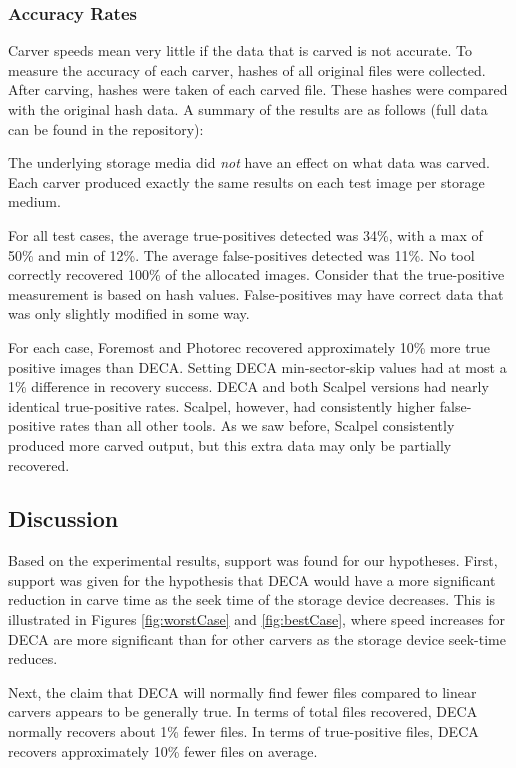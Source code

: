 \documentclass[final,5p,times,twocolumn,authoryear]{elsarticle}
\begin{document}
\subsubsection{Accuracy Rates}
Carver speeds mean very little if the data that is carved is not accurate. To measure the accuracy of each carver, hashes of all original files were collected. After carving, hashes were taken of each carved file. These hashes were compared with the original hash data. A summary of the results are as follows (full data can be found in the repository):

The underlying storage media did \emph{not} have an effect on what data was carved. Each carver produced exactly the same results on each test image per storage medium.

For all test cases, the average true-positives detected was 34\%, with a max of 50\% and min of 12\%. The average false-positives detected was 11\%. No tool correctly recovered 100\% of the allocated images. Consider that the true-positive measurement is based on hash values. False-positives may have correct data that was only slightly modified in some way.

For each case, Foremost and Photorec recovered approximately 10\% more true positive images than DECA. Setting DECA min-sector-skip values had at most a 1\% difference in recovery success. DECA and both Scalpel versions had nearly identical true-positive rates. Scalpel, however, had consistently higher false-positive rates than all other tools. As we saw before, Scalpel consistently produced more carved output, but this extra data may only be partially recovered.

\subsection{Discussion}
Based on the experimental results, support was found for our hypotheses. First, support was given for the hypothesis that DECA would have a more significant reduction in carve time as the seek time of the storage device decreases. This is illustrated in Figures \ref{fig:worstCase} and \ref{fig:bestCase}, where speed increases for DECA are more significant than for other carvers as the storage device seek-time reduces.

Next, the claim that DECA will normally find fewer files compared to linear carvers appears to be generally true. In terms of total files recovered, DECA normally recovers about 1\% fewer files. In terms of true-positive files, DECA recovers approximately 10\% fewer files on average.
\end{document}
